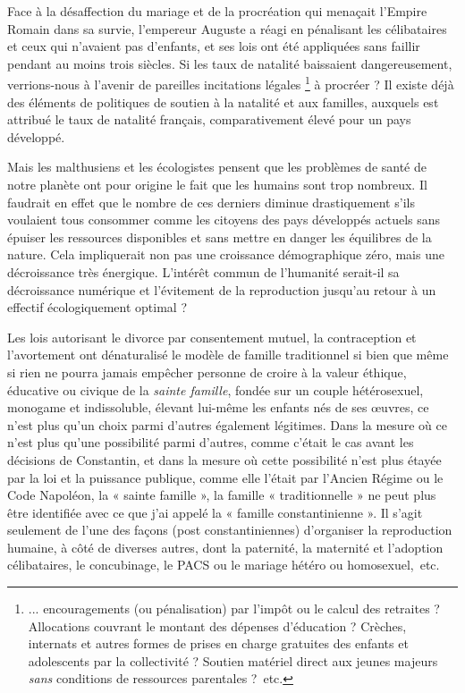  Face à la désaffection du mariage et de la procréation qui menaçait l'Empire Romain dans sa survie, l'empereur Auguste a réagi en pénalisant les célibataires et ceux qui n'avaient pas d'enfants, et ses lois ont été appliquées sans faillir pendant au moins trois siècles. Si les taux de natalité baissaient dangereusement, verrions-nous à l'avenir de pareilles incitations légales%
\footnote{... encouragements (ou pénalisation) par l'impôt ou le calcul des retraites ? Allocations couvrant le montant des dépenses d'éducation ? Crèches, internats et autres formes de prises en charge gratuites des enfants et adolescents par la collectivité ? Soutien matériel direct aux jeunes majeurs \emph{sans} conditions de ressources parentales ?~etc.} 
à procréer ? Il existe déjà des éléments de politiques de soutien à la natalité et aux familles, auxquels est attribué le taux de natalité français, comparativement élevé pour un pays développé.
 
 Mais les malthusiens et les écologistes pensent que les problèmes de santé de notre planète ont pour origine le fait que les humains sont trop nombreux. Il faudrait en effet que le nombre de ces derniers diminue drastiquement s'ils voulaient tous consommer comme les citoyens des pays développés actuels sans épuiser les ressources disponibles et sans mettre en danger les équilibres de la nature. Cela impliquerait non pas une croissance démographique zéro, mais une décroissance très énergique. L'intérêt commun de l'humanité serait-il sa décroissance numérique et l'évitement de la reproduction jusqu'au retour à un effectif écologiquement optimal ? 
 




Les lois autorisant le divorce par consentement mutuel, la contraception et l'avortement ont dénaturalisé le modèle de famille traditionnel si bien que même si rien ne pourra jamais empêcher personne de croire à la valeur éthique, éducative ou civique de la {\emph{sainte famille}}, fondée sur un couple hétérosexuel, monogame et indissoluble, élevant lui-même les enfants nés de ses œuvres, ce n'est plus qu'un choix parmi d'autres également légitimes. Dans la mesure où ce n'est plus qu'une possibilité parmi d'autres, comme c'était le cas avant les décisions de Constantin, et dans la mesure où cette possibilité n'est plus étayée par la loi et la puissance publique, comme elle l'était par l'Ancien Régime ou le Code Napoléon, la « sainte famille », la famille « traditionnelle » ne peut plus être identifiée avec ce que j'ai appelé la « famille constantinienne ». Il s'agit seulement de l'une des façons (post constantiniennes) d'organiser la reproduction humaine, à côté de diverses autres, dont la paternité, la maternité et l'adoption célibataires, le concubinage, le PACS ou le mariage hétéro ou homosexuel,~etc.

